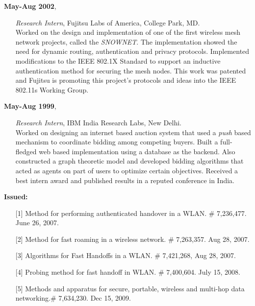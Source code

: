 \begin{resume}
 {\bf May-Aug 2002},   	
    \begin{itemize}
         \item[] {\it Research Intern}, Fujitsu Labs of America, College Park, MD.\\
		Worked on the design and implementation of one of the first wireless mesh network projects, called the {\em SNOWNET}.
	        The implementation showed the need for dynamic routing, authentication and privacy protocols. Implemented modifications to the IEEE 802.1X Standard
                to support an inductive authentication method for securing the mesh nodes. This work was patented and Fujitsu is promoting this project's
                protocols and ideas into the IEEE 802.11s Working Group.
		
    \end{itemize}

 {\bf May-Aug 1999},   	
    \begin{itemize}
         \item[] {\it Research Intern},  IBM India Research Labs, New Delhi.\\
		Worked on designing an internet based auction system that used a {\em push} based mechanism to
                coordinate bidding among competing buyers. Built a full-fledged web based implementation using a database as the
                backend. Also constructed a graph theoretic model and developed bidding algorithms that
                acted as agents on part of users to optimize certain
		objectives. Received a best intern award and published results
		in a reputed conference in India.
    \end{itemize}


\vspace{-0.7cm}

{\bf Issued:}
    \begin{itemize}
       \item [] [1] Method for performing authenticated handover in a WLAN. \# 7,236,477. June 26, 2007.
       \item [] [2] Method for fast roaming in a wireless network. \# 7,263,357. Aug 28, 2007.
       \item [] [3] Algorithms for Fast Handoffs in a WLAN. \# 7,421,268, Aug 28, 2007.
       \item [] [4] Probing method for fast handoff in WLAN. \# 7,400,604. July 15, 2008.
       \item [] [5] Methods and apparatus for secure, portable, wireless and multi-hop data networking.\# 7,634,230. Dec 15, 2009.
     \end{itemize}


\end{resume}
